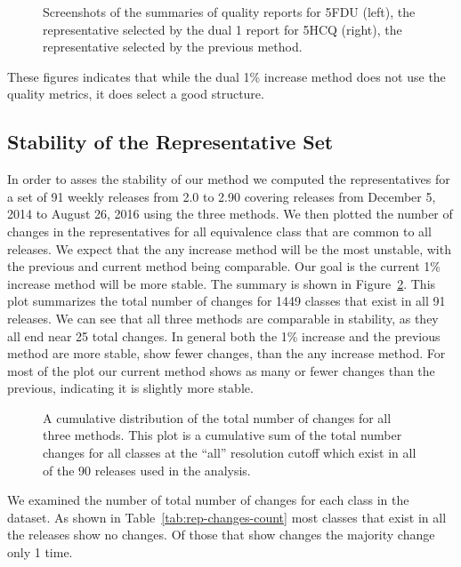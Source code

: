 \begin{figure}
  \caption{Screenshots of the summaries of quality reports for 5FDU (left), the
    representative selected by the dual 1%
    report for 5HCQ (right), the representative selected by the previous
  method.}
  \label{fig:tt-lsu-report}
\end{figure}

These figures indicates that while the dual 1\% increase method does not use the
quality metrics, it does select a good structure.

\subsection{Stability of the Representative Set}

In order to asses the stability of our method we computed the representatives
for a set of 91 weekly releases from 2.0 to 2.90 covering releases from December
5, 2014 to August 26, 2016 using the three methods. We then plotted the number
of changes in the representatives for all equivalence class that are common to
all releases. We expect that the any increase method will be the most unstable,
with the previous and current method being comparable. Our goal is the current
1\% increase method will be more stable. The summary is shown in
Figure~\ref{fig:rep-changes}. This plot summarizes the total number of changes
for 1449 classes that exist in all 91 releases. We can see that all three
methods are comparable in stability, as they all end near 25 total changes. In
general both the 1\% increase and the previous method are more stable, show fewer
changes, than the any increase method. For most of the plot our current method
shows as many or fewer changes than the previous, indicating it is slightly more
stable.

\begin{figure}
  \caption{A cumulative distribution of the total number of changes for all
    three methods. This plot is a cumulative sum of the total number changes for
    all classes at the ``all'' resolution cutoff which exist in all of the 90
  releases used in the analysis.}
  \label{fig:rep-changes}
\end{figure}

We examined the number of total number of changes for each class in the dataset.
As shown in Table~\ref{tab:rep-changes-count} most classes that exist in all the
releases show no changes. Of those that show changes the majority change only 1
time.

